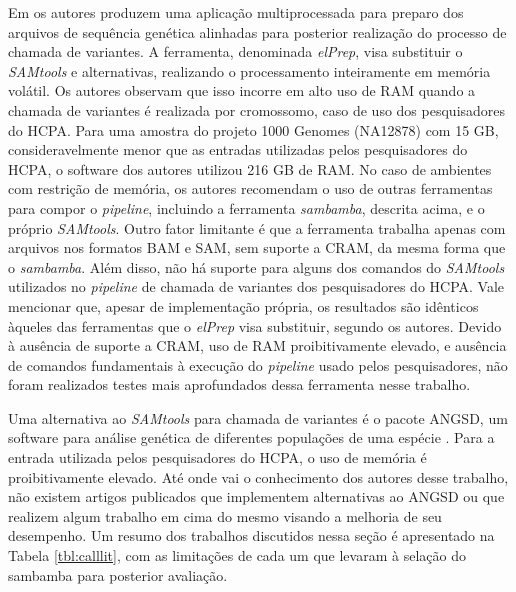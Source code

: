 \documentclass[cic,tc]{iiufrgs}
\begin{document}
Em \cite{herzeel2015elprep} os autores produzem uma aplicação
multiprocessada para preparo dos arquivos de sequência genética alinhadas para
posterior realização do processo de chamada de variantes. A ferramenta,
denominada \textit{elPrep}, visa substituir o \textit{SAMtools} e alternativas, realizando o
processamento inteiramente em memória volátil. Os autores observam que isso
incorre em alto uso de RAM quando a chamada de variantes é realizada por
cromossomo, caso de uso dos pesquisadores do HCPA. Para uma amostra do projeto
1000 Genomes (NA12878) com 15 GB, consideravelmente menor que as entradas
utilizadas pelos pesquisadores do HCPA, o software dos autores utilizou 216 GB
de RAM. No caso de ambientes com restrição de memória, os autores recomendam o
uso de outras ferramentas para compor o \textit{pipeline}, incluindo a ferramenta
\textit{sambamba}, descrita acima, e o próprio \textit{SAMtools}. Outro fator limitante é que a
ferramenta trabalha apenas com arquivos nos formatos BAM e SAM, sem suporte a
CRAM, da mesma forma que o \textit{sambamba}. Além disso, não há suporte para alguns dos
comandos do \textit{SAMtools} utilizados no \textit{pipeline} de chamada de variantes dos
pesquisadores do HCPA. Vale mencionar que, apesar de implementação própria, os
resultados são idênticos àqueles das ferramentas que o \textit{elPrep} visa substituir,
segundo os autores. Devido à ausência de suporte a CRAM, uso de RAM
proibitivamente elevado, e ausência de comandos fundamentais à execução do
\textit{pipeline} usado pelos pesquisadores, não foram realizados testes mais
aprofundados dessa ferramenta nesse trabalho.

Uma alternativa ao \textit{SAMtools} para chamada de variantes é o pacote ANGSD, um
software para análise genética de diferentes populações de uma espécie
\cite{korneliussen2014angsd}. Para a entrada utilizada pelos pesquisadores do
HCPA, o uso de memória é proibitivamente elevado. Até onde vai o conhecimento
dos autores desse trabalho, não existem artigos publicados que implementem
alternativas ao ANGSD ou que realizem algum trabalho em cima do mesmo visando a
melhoria de seu desempenho. Um resumo dos trabalhos discutidos nessa seção é
apresentado na Tabela \ref{tbl:calllit}, com as limitações de cada um que
levaram à selação do sambamba para posterior avaliação.
\end{document}
